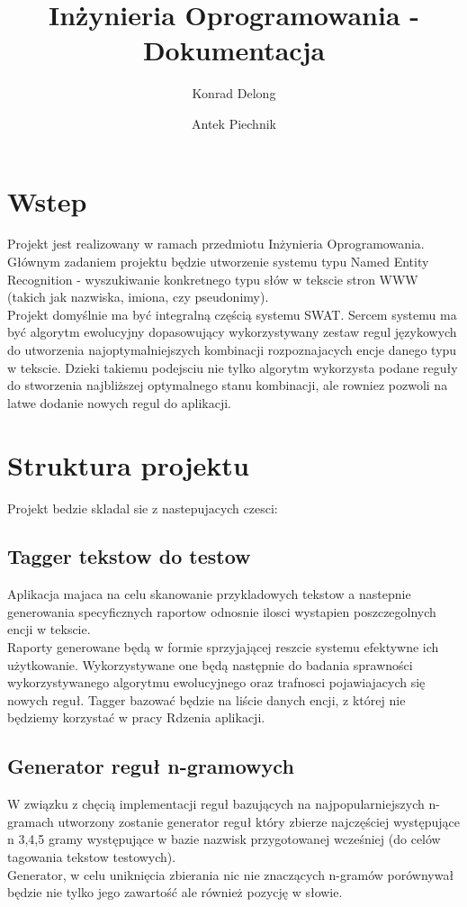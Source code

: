 \documentclass[12pt]{article}
\author{Konrad Delong \and Antek Piechnik}
\title{Inżynieria Oprogramowania - Dokumentacja}
\begin{document}
\maketitle
\tableofcontents
\newpage

\section{Wstep}
Projekt jest realizowany w ramach przedmiotu Inżynieria Oprogramowania. Głównym zadaniem projektu będzie utworzenie systemu typu Named Entity Recognition - wyszukiwanie konkretnego typu słów w tekscie stron WWW (takich jak nazwiska, imiona, czy pseudonimy). 
\\Projekt domyślnie ma być integralną częścią systemu SWAT. Sercem systemu ma być algorytm ewolucyjny dopasowujący wykorzystywany zestaw regul językowych do utworzenia najoptymalniejszych kombinacji rozpoznajacych encje danego typu w tekscie. Dzieki takiemu podejsciu nie tylko algorytm wykorzysta podane reguły do stworzenia najbliższej optymalnego stanu kombinacji, ale rowniez pozwoli na latwe dodanie nowych regul do aplikacji.
\section{Struktura projektu}
Projekt bedzie skladal sie z nastepujacych czesci:
\subsection{Tagger tekstow do testow}
Aplikacja majaca na celu skanowanie przykladowych tekstow a nastepnie generowania specyficznych raportow odnosnie ilosci wystapien poszczegolnych encji w tekscie. 
\\Raporty generowane będą w formie sprzyjającej reszcie systemu efektywne ich użytkowanie. Wykorzystywane one będą następnie do badania sprawności wykorzystywanego algorytmu ewolucyjnego oraz trafnosci pojawiajacych się nowych reguł. 
Tagger bazować będzie na liście danych encji, z której nie będziemy korzystać w pracy Rdzenia aplikacji.
\subsection{Generator reguł n-gramowych}
W związku z chęcią implementacji reguł bazujących na najpopularniejszych n-gramach utworzony zostanie generator reguł który zbierze najczęściej występujące n {3,4,5} gramy występujące w bazie nazwisk przygotowanej wcześniej (do celów tagowania tekstow testowych). 
\\Generator, w celu uniknięcia zbierania nic nie znaczących n-gramów porównywał będzie nie tylko jego zawartość ale również pozycję w słowie.
\end{document}
